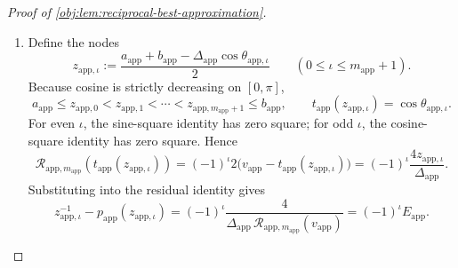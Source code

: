 \documentclass[11pt]{article}
\begin{document}
\begin{proof}[Proof of \cref{obj:lem:reciprocal-best-approximation}]
\begin{enumerate}
\item Define the nodes
\[
z_{\mathrm{app},\iota}:=
\frac{a_{\mathrm{app}}+b_{\mathrm{app}}
-\Delta_{\mathrm{app}}\cos\theta_{\mathrm{app},\iota}}{2}
\qquad(0\le\iota\le m_{\mathrm{app}}+1).
\]
Because cosine is strictly decreasing on \([0,\pi]\),
\[
a_{\mathrm{app}}\le z_{\mathrm{app},0}
<z_{\mathrm{app},1}<\cdots
<z_{\mathrm{app},m_{\mathrm{app}}+1}\le b_{\mathrm{app}},
\qquad
t_{\mathrm{app}}(z_{\mathrm{app},\iota})
=\cos\theta_{\mathrm{app},\iota}.
\]
For even \(\iota\), the sine-square identity has zero square; for odd \(\iota\), the cosine-square identity has zero square. Hence
\[
\mathcal R_{\mathrm{app},m_{\mathrm{app}}}
(t_{\mathrm{app}}(z_{\mathrm{app},\iota}))
=
(-1)^\iota
2\bigl(v_{\mathrm{app}}-t_{\mathrm{app}}(z_{\mathrm{app},\iota})\bigr)
=
(-1)^\iota\frac{4z_{\mathrm{app},\iota}}{\Delta_{\mathrm{app}}}.
\]
Substituting into the residual identity gives
\[
z_{\mathrm{app},\iota}^{-1}
-p_{\mathrm{app}}(z_{\mathrm{app},\iota})
=
(-1)^\iota
\frac{4}
{\Delta_{\mathrm{app}}\,
\mathcal R_{\mathrm{app},m_{\mathrm{app}}}(v_{\mathrm{app}})}
=
(-1)^\iota E_{\mathrm{app}}.
\]


\end{enumerate}
\end{proof}
\end{document}
